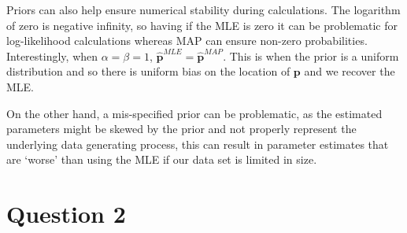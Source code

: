 \documentclass[12pt]{article}
\begin{document}
\begin{enumerate}
Priors can also help ensure numerical stability during calculations.
The logarithm of zero is negative infinity, so having if the MLE is zero it can be problematic for log-likelihood calculations whereas MAP can ensure non-zero probabilities.
Interestingly, when $\alpha=\beta=1$, $\hat{\textbf{p}}^{MLE} = \hat{\textbf{p}}^{MAP}$.
This is when the prior is a uniform distribution and so there is uniform bias on the location of $\textbf{p}$ and we recover the MLE.

On the other hand, a mis-specified prior can be problematic, as the estimated parameters might be skewed by the prior and not properly represent the underlying data generating process, this can result in parameter estimates that are `worse' than using the MLE if our data set is limited in size.







\end{enumerate}

\newpage
\section*{Question 2}
\end{document}

